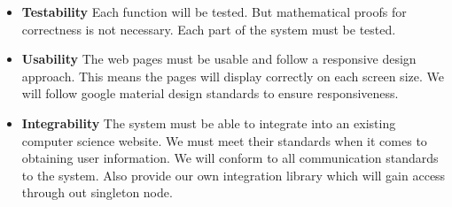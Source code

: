 \begin{itemize}
	\item \textbf{Testability}
		Each function will be tested. But mathematical proofs for correctness is not necessary. Each part of the system must be tested. 
	\item \textbf{Usability}
		The web pages must be usable and follow a responsive design approach. This means the pages will display correctly on each screen size. We will follow google material design standards to ensure responsiveness.
	\item \textbf{Integrability}
		The system must be able to integrate into an existing computer science website. We must meet their standards when it comes to obtaining user information. We will conform to all communication standards to the system. Also provide our own integration library which will gain access through out singleton node.
\end{itemize}

%